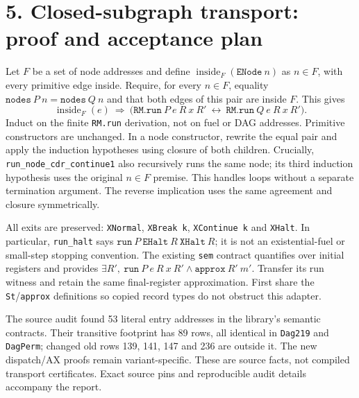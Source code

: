 \documentclass[10pt]{article}
\newcommand{\code}[1]{\texttt{#1}}
\begin{document}
\section*{5. Closed-subgraph transport: proof and acceptance plan}
Let $F$ be a set of node addresses and define $\operatorname{inside}_F(\code{ENode}\ n)$ as $n\in F$, with every primitive edge inside. Require, for every $n\in F$, equality $\code{nodes}\ P\ n=\code{nodes}\ Q\ n$ and that both edges of this pair are inside $F$. This gives
\[
\operatorname{inside}_F(e)\ \Longrightarrow\
\bigl(\code{RM.run}\ P\ e\ R\ x\ R'\ \longleftrightarrow\
\code{RM.run}\ Q\ e\ R\ x\ R'\bigr).
\]
Induct on the finite \code{RM.run} derivation, not on fuel or DAG addresses. Primitive constructors are unchanged. In a node constructor, rewrite the equal pair and apply the induction hypotheses using closure of both children. Crucially, \code{run\_node\_cdr\_continue1} also recursively runs the same node; its third induction hypothesis uses the original $n\in F$ premise. This handles loops without a separate termination argument. The reverse implication uses the same agreement and closure symmetrically.

All exits are preserved: \code{XNormal}, \code{XBreak k}, \code{XContinue k} and \code{XHalt}. In particular, \code{run\_halt} says $\code{run}\ P\ \code{EHalt}\ R\ \code{XHalt}\ R$; it is not an existential-fuel or small-step stopping convention. The existing \code{sem} contract quantifies over initial registers and provides $\exists R',\ \code{run}\ P\ e\ R\ x\ R'\wedge\code{approx}\ R'\ m'$. Transfer its run witness and retain the same final-register approximation. First share the \code{St}/\code{approx} definitions so copied record types do not obstruct this adapter.

The source audit found 53 literal entry addresses in the library's semantic contracts. Their transitive footprint has 89 rows, all identical in \code{Dag219} and \code{DagPerm}; changed old rows 139, 141, 147 and 236 are outside it. The new dispatch/AX proofs remain variant-specific. These are source facts, not compiled transport certificates. Exact source pins and reproducible audit details accompany the report.
\end{document}
